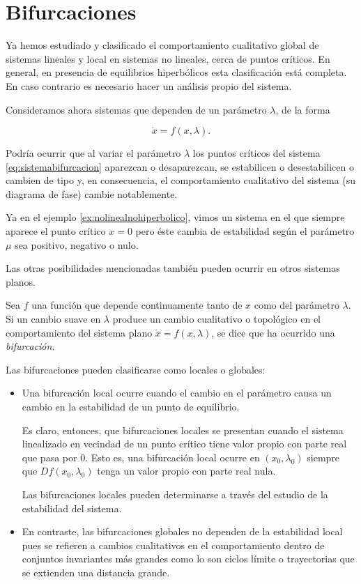 \chapter{Bifurcaciones}
Ya hemos estudiado y clasificado el comportamiento cualitativo global de sistemas lineales y local en sistemas no lineales, cerca de puntos críticos. En general, en presencia de equilibrios hiperbólicos esta clasificación está completa. En caso contrario es necesario hacer un análisis propio del sistema.

Consideramos ahora sistemas que dependen de un parámetro $\lambda$, de la forma

\begin{equation} \label{eq:sistemabifurcacion}
	\dot{x} = f(x, \lambda).
\end{equation}

Podría ocurrir que al variar el parámetro $\lambda$ los puntos críticos del sistema \ref{eq:sistemabifurcacion} aparezcan o desaparezcan, se estabilicen o desestabilicen o cambien de tipo y, en consecuencia, el comportamiento cualitativo del sistema (su diagrama de fase) cambie notablemente.

Ya en el ejemplo \ref{ex:nolinealnohiperbolico}, vimos un sistema en el que siempre aparece el punto crítico $x = 0$ pero éste cambia de estabilidad según el parámetro $\mu$ sea positivo, negativo o nulo.

Las otras posibilidades mencionadas también pueden ocurrir en otros sistemas planos.

\begin{definition} \label{def:bifurcacion}
Sea $f$ una función que depende continuamente tanto de $x$ como del parámetro $\lambda$. Si un cambio suave en $\lambda$ produce un cambio cualitativo o topológico en el comportamiento del sistema plano $\dot{x} = f(x,\lambda)$, se dice que ha ocurrido una \emph{bifurcación}.
\end{definition}

Las bifurcaciones pueden clasificarse como locales o globales:
\begin{itemize}
	\item Una bifurcación local ocurre cuando el cambio en el parámetro causa un cambio en la estabilidad de un punto de equilibrio.

	Es claro, entonces, que bifurcaciones locales se presentan cuando el sistema linealizado en vecindad de un punto crítico tiene valor propio con parte real que pasa por $0$.
	Esto es, una bifurcación local ocurre en $(x_0, \lambda_0)$ siempre que $Df(x_0, \lambda_0)$ tenga un valor propio con parte real nula.

	Las bifurcaciones locales pueden determinarse a través del estudio de la estabilidad del sistema.

	\item En contraste, las bifurcaciones globales no dependen de la estabilidad local pues se refieren a cambios cualitativos en el comportamiento dentro de conjuntos invariantes más grandes como lo son ciclos límite o trayectorias que se extienden una distancia grande.
\end{itemize}

